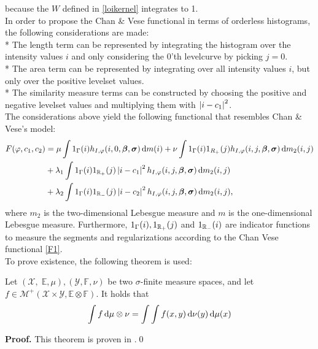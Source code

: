 because the $W$ defined in \eqref{loikernel} integrates to 1.\\

In order to propose the Chan \& Vese functional in terms of orderless histograms, the following considerations are made:\\
* The length term can be represented by integrating the histogram over the intensity values $i$ and only considering the 0'th levelcurve by picking $j=0$.\\
* The area term can be represented by integrating over all intensity values $i$, but only over the positive levelset values.\\
* The similarity measure terms can be constructed by choosing the positive and negative levelset values and multiplying them with $\left| {i-c_1} \right|^2$.\\

The considerations above yield the following functional that resembles Chan \& Vese's model:
\begin{equation}
  \begin{split}
    F(\phi,c_1,c_2) &= \mu \int 1_\Gamma(i) h_{I,\phi}(i,0,\vec{\beta},\vec{\sigma})\df m(i) + \nu\int 1_{\Gamma}(i)1_{R_+}(j) h_{I,\phi}(i,j,\vec{\beta},\vec{\sigma})\df m_2(i,j)\\
    &+ \lambda_1\int 1_\Gamma(i) 1_{\R_+}(j) \abs{i-c_1}^2h_{I,\phi}(i,j,\vec{\beta},\vec{\sigma})\df m_2(i, j)\\
    &+ \lambda_2\int 1_\Gamma(i) 1_{\R_-}(j) \abs{i-c_2}^2h_{I,\phi}(i,j,\vec{\beta},\vec{\sigma})\df m_2(i, j),
  \end{split}\label{LOLF}
\end{equation}
where $m_2$ is the two-dimensional Lebesgue measure and $m$ is the one-dimensional Lebesgue measure. Furthermore, $1_\Gamma(i), 1_{\mathbb R_+}(j)$ and $1_{\mathbb R_-}(i)$ are indicator functions to measure the segments and regularizations according to the Chan Vese functional \eqref{F1}.\\

To prove existence, the following theorem is used:
\begin{theorem}[Tonelli]\label{Tonelli}
Let $(\mathcal{X},\;\mathbb{E},\mu),(\mathcal{Y},\mathbb{F},\nu)$ be two $\sigma$-finite measure spaces, and let $f\in\mathcal{M}^+(\mathcal{X}\times \mathcal{Y},\mathbb{E}\otimes\mathbb{F})$. It holds that
\begin{equation}
\int f \,{\rm d}\mu\otimes\nu = \int\int f(x,y) \,{\rm d} \nu(y) \,{\rm d} \mu(x)
\end{equation}
\end{theorem}
\textbf{Proof.} This theorem is proven in \cite[p.~195]{hansen.09}.\hfill\qed\\

